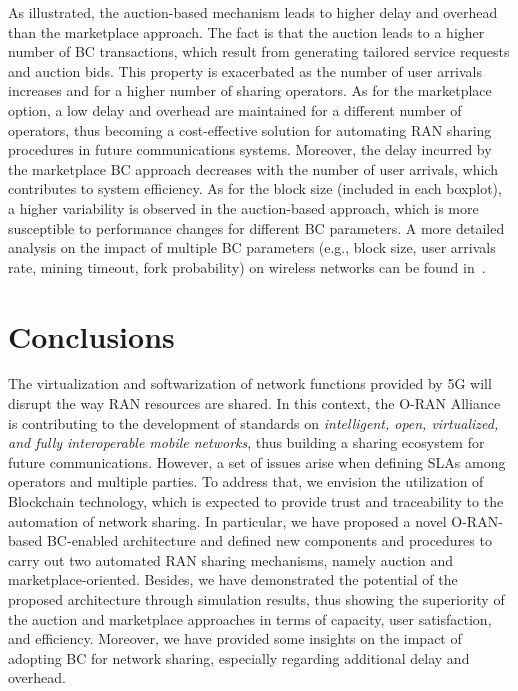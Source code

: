 \documentclass[journal]{IEEEtran}
\begin{document}
As illustrated, the auction-based mechanism leads to higher delay and overhead than the marketplace approach. The fact is that the auction leads to a higher number of BC transactions, which result from generating tailored service requests and auction bids. This property is exacerbated as the number of user arrivals increases and for a higher number of sharing operators. As for the marketplace option, a low delay and overhead are maintained for a different number of operators, thus becoming a cost-effective solution for automating RAN sharing procedures in future communications systems. Moreover, the delay incurred by the marketplace BC approach decreases with the number of user arrivals, which contributes to system efficiency. As for the block size (included in each boxplot), a higher variability is observed in the auction-based approach, which is more susceptible to performance changes for different BC parameters. A more detailed analysis on the impact of multiple BC parameters (e.g., block size, user arrivals rate, mining timeout, fork probability) on wireless networks can be found in~\cite{FWilhelmi_PIMRC}.


\section{Conclusions}
\label{section:conclusions}
The virtualization and softwarization of network functions provided by 5G will disrupt the way RAN resources are shared. In this context, the O-RAN Alliance is contributing to the development of standards on \textit{intelligent, open, virtualized, and fully interoperable mobile networks}, thus building a sharing ecosystem for future communications. However, a set of issues arise when defining SLAs among operators and multiple parties. To address that, we envision the utilization of Blockchain technology, which is expected to provide trust and traceability to the automation of network sharing. In particular, we have proposed a novel O-RAN-based BC-enabled architecture and defined new components and procedures to carry out two automated RAN sharing mechanisms, namely auction and marketplace-oriented. Besides, we have demonstrated the potential of the proposed architecture through simulation results, thus showing the superiority of the auction and marketplace approaches in terms of capacity, user satisfaction, and efficiency. Moreover, we have provided some insights on the impact of adopting BC for network sharing, especially regarding additional delay and overhead.
\end{document}
